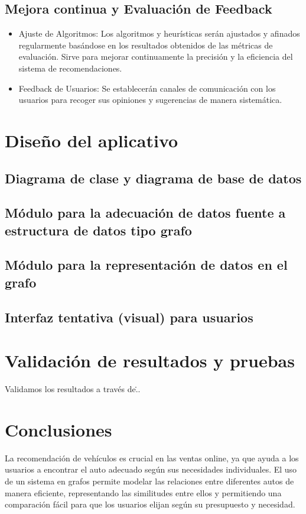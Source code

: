 \documentclass[12pt]{article}
\begin{document}
\subsection{Mejora continua y Evaluación de Feedback}
\begin{itemize}
    \item Ajuste de Algoritmos: Los algoritmos y heurísticas serán ajustados y afinados regularmente basándose en los resultados obtenidos de las métricas de evaluación. Sirve para mejorar continuamente la precisión y la eficiencia del sistema de recomendaciones.
    \item Feedback de Usuarios: Se establecerán canales de comunicación con los usuarios para recoger sus opiniones y sugerencias de manera sistemática.
\end{itemize}




\section{Diseño del aplicativo}
\subsection{Diagrama de clase y diagrama de base de datos}
\subsection{Módulo para la adecuación de datos fuente a estructura de datos tipo grafo}
\subsection{Módulo para la representación de datos en el grafo}
\subsection{Interfaz tentativa (visual) para usuarios}

\section{Validación de resultados y pruebas}
Validamos los resultados a través de\...

\section{Conclusiones}
La recomendación de vehículos es crucial en las ventas online, ya que ayuda a los usuarios a encontrar el auto adecuado según sus necesidades individuales. El uso de un sistema en grafos permite modelar las relaciones entre diferentes autos de manera eficiente, representando las similitudes entre ellos y permitiendo una comparación fácil para que los usuarios elijan según su presupuesto y necesidad.
\end{document}
